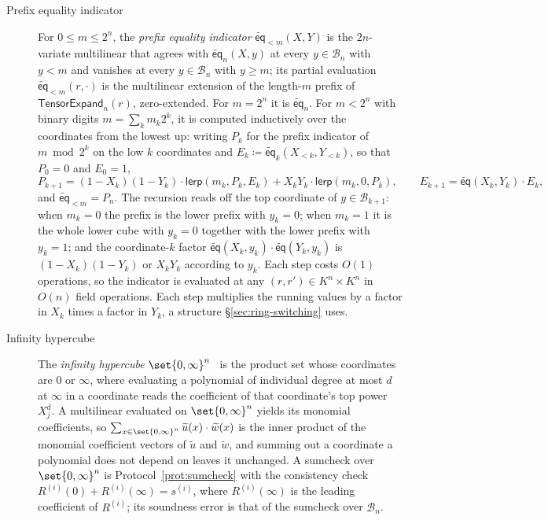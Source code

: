 \documentclass{article}
\theoremstyle{definition}
\newcommand*{\mle}{\widetilde}
\newcommand{\eq}{\mathsf{eq}}
\newcommand{\BB}{\mathcal{B}}
\begin{document}
\begin{description}
\item[Prefix equality indicator] For $0 \le m \le 2^n$, the \emph{prefix equality indicator} $\mle{\eq}_{< m}(X, Y)$ is the $2n$-variate multilinear that agrees with $\mle{\eq}_n(X, y)$ at every $y \in \BB_n$ with $y < m$ and vanishes at every $y \in \BB_n$ with $y \ge m$; its partial evaluation $\mle{\eq}_{< m}(r, \cdot)$ is the multilinear extension of the length-$m$ prefix of $\textsf{TensorExpand}_n(r)$, zero-extended. For $m = 2^n$ it is $\mle{\eq}_n$. For $m < 2^n$ with binary digits $m = \sum_k m_k 2^k$, it is computed inductively over the coordinates from the lowest up: writing $P_k$ for the prefix indicator of $m \bmod 2^k$ on the low $k$ coordinates and $E_k \coloneqq \mle{\eq}_k(X_{< k}, Y_{< k})$, so that $P_0 = 0$ and $E_0 = 1$,
\[
  P_{k + 1} = (1 - X_k)(1 - Y_k) \cdot \textsf{lerp}(m_k, P_k, E_k) + X_k Y_k \cdot \textsf{lerp}(m_k, 0, P_k), \qquad E_{k + 1} = \mle{\eq}(X_k, Y_k) \cdot E_k,
\]
and $\mle{\eq}_{< m} = P_n$. The recursion reads off the top coordinate of $y \in \BB_{k + 1}$: when $m_k = 0$ the prefix is the lower prefix with $y_k = 0$; when $m_k = 1$ it is the whole lower cube with $y_k = 0$ together with the lower prefix with $y_k = 1$; and the coordinate-$k$ factor $\mle{\eq}(X_k, y_k) \cdot \mle{\eq}(Y_k, y_k)$ is $(1 - X_k)(1 - Y_k)$ or $X_k Y_k$ according to $y_k$. Each step costs $O(1)$ operations, so the indicator is evaluated at any $(r, r') \in K^n \times K^n$ in $O(n)$ field operations. Each step multiplies the running values by a factor in $X_k$ times a factor in $Y_k$, a structure \S\ref{sec:ring-switching} uses.

\item[Infinity hypercube] The \emph{infinity hypercube} $\set{0, \infty}^n$~\cite[\S 3]{cryptoeprint:2026/762} is the product set whose coordinates are $0$ or $\infty$, where evaluating a polynomial of individual degree at most $d$ at $\infty$ in a coordinate reads the coefficient of that coordinate's top power $X_j^d$. A multilinear evaluated on $\set{0, \infty}^n$ yields its monomial coefficients, so $\sum_{x \in \set{0, \infty}^n} \mle{u}(x) \cdot \mle{w}(x)$ is the inner product of the monomial coefficient vectors of $\mle{u}$ and $\mle{w}$, and summing out a coordinate a polynomial does not depend on leaves it unchanged. A sumcheck over $\set{0, \infty}^n$ is Protocol~\ref{prot:sumcheck} with the consistency check $R^{(i)}(0) + R^{(i)}(\infty) = s^{(i)}$, where $R^{(i)}(\infty)$ is the leading coefficient of $R^{(i)}$; its soundness error is that of the sumcheck over $\BB_n$.


\end{description}
\end{document}
